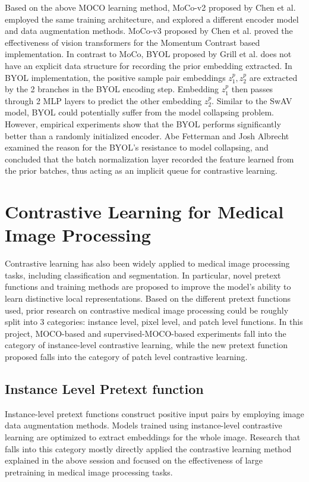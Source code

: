 \documentclass[12pt,twoside]{report}
\begin{document}
Based on the above MOCO learning method, MoCo-v2 proposed by Chen et al.\cite{mocov2} employed the same training architecture, and explored a different encoder model and data augmentation methods. MoCo-v3 proposed by Chen et al.\cite{mocov3} proved the effectiveness of vision transformers for the Momentum Contrast based implementation. In contrast to MoCo, BYOL proposed by Grill et al.\cite{byol} does not have an explicit data structure for recording the prior embedding extracted. In BYOL implementation, the positive sample pair embeddings $z^p_1, z^p_2$ are extracted by the 2 branches in the BYOL encoding step. Embedding $z^p_1$ then passes through 2 MLP layers to predict the other embedding $z^p_2$. Similar to the SwAV model, BYOL could potentially suffer from the model collapsing problem. However, empirical experiments show that the BYOL performs significantly better than a randomly initialized encoder. Abe Fetterman and Josh Albrecht\cite{explainbyol} examined the reason for the BYOL's resistance to model collapsing, and concluded that the batch normalization layer recorded the feature learned from the prior batches, thus acting as an implicit queue for contrastive learning. 

\section{Contrastive Learning for Medical Image Processing}
Contrastive learning has also been widely applied to medical image processing tasks, including classification and segmentation. In particular, novel pretext functions and training methods are proposed to improve the model's ability to learn distinctive local representations. Based on the different pretext functions used, prior research on contrastive medical image processing could be roughly split into 3 categories: instance level, pixel level, and patch level functions. In this project, MOCO-based and supervised-MOCO-based experiments fall into the category of instance-level contrastive learning, while the new pretext function proposed falls into the category of patch level contrastive learning.



\subsection{Instance Level Pretext function}
Instance-level pretext functions construct positive input pairs by employing image data augmentation methods. Models trained using instance-level contrastive learning are optimized to extract embeddings for the whole image. Research that falls into this category mostly directly applied the contrastive learning method explained in the above session and focused on the effectiveness of large pretraining in medical image processing tasks.  \\
\end{document}
